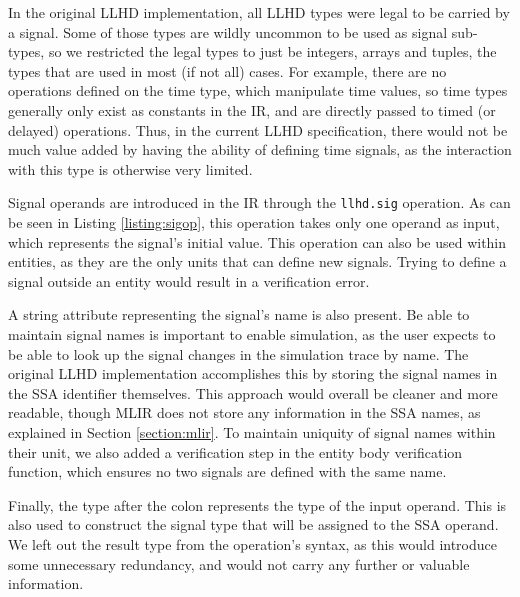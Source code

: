 In the original LLHD implementation, all LLHD types were legal to be carried by a signal. Some of those types are wildly uncommon to be used as signal sub-types, so we restricted the legal types to just be integers, arrays and tuples, the types that are used in most (if not all) cases. For example, there are no operations defined on the time type, which manipulate time values, so time types generally only exist as constants in the IR, and are directly passed to timed (or delayed) operations. Thus, in the current LLHD specification, there would not be much value added by having the ability of defining time signals, as the interaction with this type is otherwise very limited.

Signal operands are introduced in the IR through the \texttt{llhd.sig} operation. As can be seen in Listing \ref{listing:sigop}, this operation takes only one operand as input, which represents the signal's initial value. This operation can also be used within entities, as they are the only units that can define new signals. Trying to define a signal outside an entity would result in a verification error.


A string attribute representing the signal's name is also present. Be able to maintain signal names is important to enable simulation, as the user expects to be able to look up the signal changes in the simulation trace by name. The original LLHD implementation accomplishes this by storing the signal names in the SSA identifier themselves. This approach would overall be cleaner and more readable, though MLIR does not store any information in the SSA names, as explained in Section \ref{section:mlir}. To maintain uniquity of signal names within their unit, we also added a verification step in the entity body verification function, which ensures no two signals are defined with the same name.

Finally, the type after the colon represents the type of the input operand. This is also used to construct the signal type that will be assigned to the SSA operand. We left out the result type from the operation's syntax, as this would introduce some unnecessary redundancy, and would not carry any further or valuable information.

